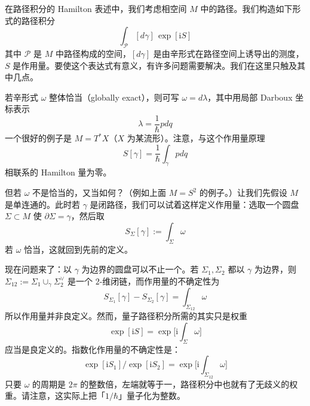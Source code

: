 在路径积分的 Hamilton 表述中，我们考虑相空间 $M$ 中的路径。我们构造如下形式的路径积分
\begin{equation}
  \int_{\mathcal{P}}[d\gamma]\,\exp[\mathrm{i}S]
  \tag{5.29}
  \label{eq:5.29}
\end{equation}
其中 $\mathcal{P}$ 是 $M$ 中路径构成的空间，$[d\gamma]$ 是由辛形式在路径空间上诱导出的测度，$S$ 是作用量。要使这个表达式有意义，有许多问题需要解决。我们在这里只触及其中几点。

若辛形式 $\omega$ 整体恰当（globally exact），则可写 $\omega=d\lambda$，其中用局部 Darboux 坐标表示
\begin{equation}
  \lambda=\frac{1}{\hbar}pdq
  \tag{5.30}
  \label{eq:5.30}
\end{equation}
一个很好的例子是 $M=T^*X$（$X$ 为某流形）。注意，与这个作用量原理
\begin{equation}
  S[\gamma]=\frac{1}{\hbar}\int_\gamma pdq
  \tag{5.31}
  \label{eq:5.31}
\end{equation}
相联系的 Hamilton 量为零。

但若 $\omega$ 不是恰当的，又当如何？（例如上面 $M=S^2$ 的例子。）让我们先假设 $M$ 是单连通的。此时若 $\gamma$ 是闭路径，我们可以试着这样定义作用量：选取一个圆盘 $\Sigma\subset M$ 使 $\partial\Sigma=\gamma$，然后取
\begin{equation}
  S_\Sigma[\gamma]:=\int_\Sigma \omega
  \tag{5.32}
  \label{eq:5.32}
\end{equation}
若 $\omega$ 恰当，这就回到先前的定义。

现在问题来了：以 $\gamma$ 为边界的圆盘可以不止一个。若 $\Sigma_1,\Sigma_2$ 都以 $\gamma$ 为边界，则 $\Sigma_{12}:=\Sigma_1\cup_\gamma\Sigma_2^\vee$ 是一个 $2$-维闭链，而作用量的不确定性为
\begin{equation}
  S_{\Sigma_1}[\gamma]-S_{\Sigma_2}[\gamma]=\int_{\Sigma_{12}}\omega
  \tag{5.33}
  \label{eq:5.33}
\end{equation}
所以作用量并非良定义。然而，量子路径积分所需的其实只是权重
\begin{equation}
  \exp[\mathrm{i}S]=\exp\Big[\mathrm{i}\int_\Sigma \omega\Big]
  \tag{5.34}
  \label{eq:5.34}
\end{equation}
应当是良定义的。指数化作用量的不确定性是：
\begin{equation}
  \exp[\mathrm{i}S_1]/\exp[\mathrm{i}S_2]=\exp\Big[\mathrm{i}\int_{\Sigma_{12}}\omega\Big]
  \tag{5.35}
  \label{eq:5.35}
\end{equation}
只要 $\omega$ 的周期是 $2\pi$ 的整数倍，左端就等于一，路径积分中也就有了无歧义的权重。请注意，这实际上把「$1/\hbar$」量子化为整数。

